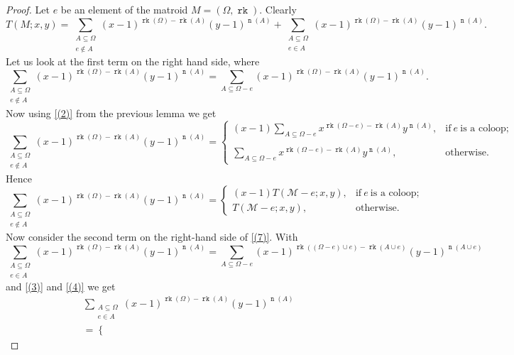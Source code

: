 \documentclass[12pt,a4paper, twoside, autooneside=false]{scrartcl}
\theoremstyle{definition}
\theoremstyle{remark}
\numberwithin{equation}{section}
\DeclareMathOperator{\rk}{\mathtt{rk}}
\DeclareMathOperator{\n}{\mathtt{n}}
\newcommand{\M}{\mathcal{M}} %
\begin{document}
\begin{proof}
Let $e$ be an element of the matroid $M = (\Omega, \rk)$. Clearly 
\begin{equation} \label{(7)}
T(M;x,y) = \sum_{\substack{A \subseteq \Omega \\ e \not \in A}} (x - 1)^{\rk(\Omega) - \rk(A)} (y - 1)^{\n(A)} + \sum_{\substack{A \subseteq \Omega \\ e \in A}} (x - 1)^{\rk(\Omega) - \rk(A)}(y - 1)^{\n(A)}.
\end{equation}
Let us look at the first term on the right hand side, where
\[
\sum_{\substack{A \subseteq \Omega \\ e \not \in A}} (x - 1)^{\rk(\Omega) - \rk(A)} (y - 1)^{\n(A)} = \sum_{A \subseteq \Omega - e} (x - 1)^{\rk(\Omega) - \rk(A)} (y - 1)^{\n(A)}.
\]
Now using \eqref{(2)} from the previous lemma we get 
\[
\sum_{\substack{A \subseteq \Omega \\ e \not \in A}} (x - 1)^{\rk(\Omega) - \rk(A)}(y - 1)^{\n(A)} = \begin{cases} 
(x - 1) \sum\limits_{A \subseteq \Omega - e} x^{\rk(\Omega - e) - \rk(A)} y^{\n(A)}, & \text{if} \ e \ \text{is a coloop}; \\ 
& \\
\sum\limits_{A \subseteq \Omega - e} x^{\rk(\Omega - e) - \rk(A)}y^{\n(A)}, & \text{otherwise}.
\end{cases}
\]
Hence 
\begin{equation} \label{(5)}
\sum_{\substack{A \subseteq \Omega \\ e \not \in A}} (x - 1)^{\rk(\Omega) - \rk(A)}(y - 1)^{\n(A)} = \begin{cases}
(x - 1) T(\M - e; x,y), & \text{if} \ e \ \text{is a coloop}; \\ 
T(\M - e; x,y), & \text{otherwise}. 
\end{cases}
\end{equation}
Now consider the second term on the right-hand side of \eqref{(7)}. With 
\[
\sum_{\substack{A \subseteq \Omega \\ e \in A}} (x - 1)^{\rk(\Omega) - \rk(A)}(y - 1)^{\n(A)} = \sum_{A \subseteq \Omega - e} (x - 1)^{\rk((\Omega - e) \cup e) - \rk(A \cup e)}(y - 1)^{\n(A \cup e)} 
\]
and \eqref{(3)} and \eqref{(4)} we get 
\begin{align*}
& \sum_{\substack{A \subseteq \Omega \\ e \in A}}(x - 1)^{\rk(\Omega) - \rk(A)}(y - 1)^{\n(A)}  \\
&=  \begin{cases}

\end{cases}
\end{align*}
\end{proof}
\end{document}
